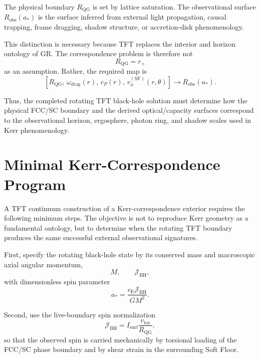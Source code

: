 The physical boundary \(R_{\mathrm{QG}}\) is set by lattice saturation. The observational surface \(R_{\mathrm{obs}}(a_\ast)\) is the surface inferred from external light propagation, causal trapping, frame dragging, shadow structure, or accretion-disk phenomenology.

This distinction is necessary because TFT replaces the interior and horizon ontology of GR. The correspondence problem is therefore not
\begin{equation}
    R_{\mathrm{QG}}
    =
    r_+
\end{equation}
as an assumption. Rather, the required map is
\begin{equation}
    \left[
    R_{\mathrm{QG}},
    \,
    \omega_{\mathrm{drag}}(r),
    \,
    c_P(r),
    \,
    v_{\phi}^{(\mathrm{SF})}(r,\theta)
    \right]
    \longrightarrow
    R_{\mathrm{obs}}(a_\ast).
\end{equation}

Thus, the completed rotating TFT black-hole solution must determine how the physical FCC/SC boundary and the derived optical/capacity surfaces correspond to the observational horizon, ergosphere, photon ring, and shadow scales used in Kerr phenomenology.

\section{Minimal Kerr-Correspondence Program}

A TFT continuum construction of a Kerr-correspondence exterior requires the following minimum steps. The objective is not to reproduce Kerr geometry as a fundamental ontology, but to determine when the rotating TFT boundary produces the same successful external observational signatures.

First, specify the rotating black-hole state by its conserved mass and macroscopic axial angular momentum,
\begin{equation}
    M, \qquad \mathcal{J}_{\mathrm{BH}},
\end{equation}
with dimensionless spin parameter
\begin{equation}
    a_\ast = \frac{c_{\mathrm{E}}\mathcal{J}_{\mathrm{BH}}}{GM^2}.
\end{equation}

Second, use the live-boundary spin normalization
\begin{equation}
    \mathcal{J}_{\mathrm{BH}} = I_{\mathrm{surf}} \frac{v_{\mathrm{tor}}}{R_{\mathrm{QG}}},
\end{equation}
so that the observed spin is carried mechanically by torsional loading of the FCC/SC phase boundary and by shear strain in the surrounding Soft Floor.

